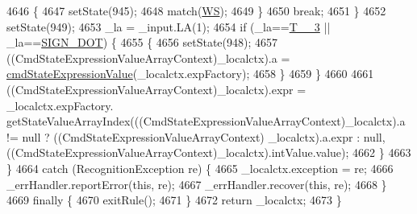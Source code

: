 \begin{DoxyCode}
4646         \{
4647         setState(945);
4648         match(\hyperlink{classgov_1_1nasa_1_1jpf_1_1inspector_1_1server_1_1expression_1_1parser_1_1_expression_grammar_parser_ace44714ae633c7b14794cc5a24d9ebf3}{WS});
4649         \}
4650         \textcolor{keywordflow}{break};
4651       \}
4652       setState(949);
4653       \_la = \_input.LA(1);
4654       \textcolor{keywordflow}{if} (\_la==\hyperlink{classgov_1_1nasa_1_1jpf_1_1inspector_1_1server_1_1expression_1_1parser_1_1_expression_grammar_parser_a68f9589dcc3fc777455467ff010385ea}{T\_\_3} || \_la==\hyperlink{classgov_1_1nasa_1_1jpf_1_1inspector_1_1server_1_1expression_1_1parser_1_1_expression_grammar_parser_af578d1cac8553bcf6f52608a4e9125f1}{SIGN\_DOT}) \{
4655         \{
4656         setState(948);
4657         ((CmdStateExpressionValueArrayContext)\_localctx).a = 
      \hyperlink{classgov_1_1nasa_1_1jpf_1_1inspector_1_1server_1_1expression_1_1parser_1_1_expression_grammar_parser_a9c38888905b31e514c2e4a695b8b2be6}{cmdStateExpressionValue}(\_localctx.expFactory);
4658         \}
4659       \}
4660 
4661        ((CmdStateExpressionValueArrayContext)\_localctx).expr =  \_localctx.expFactory.
      getStateValueArrayIndex(((CmdStateExpressionValueArrayContext)\_localctx).a != null ? ((CmdStateExpressionValueArrayContext)
      \_localctx).a.expr : null, ((CmdStateExpressionValueArrayContext)\_localctx).intValue.value); 
4662       \}
4663     \}
4664     \textcolor{keywordflow}{catch} (RecognitionException re) \{
4665       \_localctx.exception = re;
4666       \_errHandler.reportError(\textcolor{keyword}{this}, re);
4667       \_errHandler.recover(\textcolor{keyword}{this}, re);
4668     \}
4669     \textcolor{keywordflow}{finally} \{
4670       exitRule();
4671     \}
4672     \textcolor{keywordflow}{return} \_localctx;
4673   \}
\end{DoxyCode}
